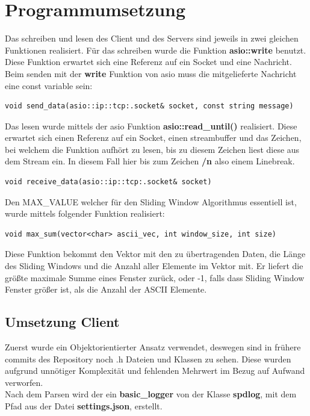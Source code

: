 \documentclass{article}
\begin{document}
\section{Programmumsetzung}

Das schreiben und lesen des Client und des Servers sind jeweils in zwei gleichen Funktionen realisiert. Für das schreiben wurde die Funktion \textbf{asio::write} benutzt. Diese Funktion erwartet sich eine Referenz auf ein Socket und eine Nachricht. Beim senden mit der \textbf{write} Funktion von asio muss die mitgelieferte Nachricht eine const variable sein:

\begin{lstlisting}
void send_data(asio::ip::tcp:.socket& socket, const string message)
\end{lstlisting}

Das lesen wurde mittels der asio Funktion \textbf{asio::read\_until()} realisiert. Diese erwartet sich einen Referenz auf ein Socket, einen streambuffer und das Zeichen, bei welchem die Funktion aufhört zu lesen, bis zu diesem Zeichen liest diese aus dem Stream ein. In diesem Fall hier bis zum Zeichen \textbf{/n} also einem Linebreak.

\begin{lstlisting}
void receive_data(asio::ip::tcp:.socket& socket)
\end{lstlisting}

Den MAX\_VALUE welcher für den Sliding Window Algorithmus essentiell ist, wurde mittels folgender Funktion realisiert:
\begin{lstlisting}
void max_sum(vector<char> ascii_vec, int window_size, int size)
\end{lstlisting}

Diese Funktion bekommt den Vektor mit den zu übertragenden Daten, die Länge des Sliding Windows und die Anzahl aller Elemente im Vektor mit. Er liefert die größte maximale Summe eines Fenster zurück, oder -1, falls dass Sliding Window Fenster größer ist, als die Anzahl der ASCII Elemente.

\subsection{Umsetzung Client}
Zuerst wurde ein Objektorientierter Ansatz verwendet, deswegen sind in frühere commits des Repository noch .h Dateien und Klassen
zu sehen. Diese wurden aufgrund unnötiger Komplexität und fehlenden Mehrwert im Bezug auf Aufwand verworfen.\\
Nach dem Parsen wird der ein \textbf{basic\_logger} von der Klasse \textbf{spdlog}, mit dem Pfad aus der Datei \textbf{settings.json}, erstellt.\newline
\end{document}
